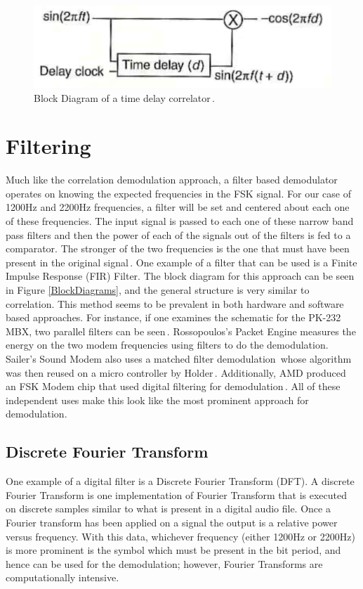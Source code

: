 \begin{figure}
  \centering
	\includegraphics[width=0.75\linewidth]{images/TimeDelayCorrelator.png} 
	\caption{Block Diagram of a time delay correlator\,\cite{Seguine2006}.}
   \label{TimeDelayCorrelator}
\end{figure}

\section{Filtering}
Much like the correlation demodulation approach, a filter based demodulator operates on knowing the expected frequencies in the FSK signal. For our case of 1200Hz and 2200Hz frequencies, a filter will be set and centered about each one of these frequencies. The input signal is passed to each one of these narrow band pass filters and then the power of each of the signals out of the filters is fed to a comparator. The stronger of the two frequencies is the one that must have been present in the original signal\,\cite{Watson1980}. One example of a filter that can be used is a Finite Impulse Response (FIR) Filter. The block diagram for this approach can be seen in Figure \ref{BlockDiagrams}, and the general structure is very similar to correlation. This method seems to be prevalent in both hardware and software based approaches. For instance, if one examines the schematic for the PK-232 MBX, two parallel filters can be seen\,\cite{Inc.2001}. Rossopoulos's Packet Engine measures the energy on the two modem frequencies using filters to do the demodulation. Sailer's Sound Modem also uses a matched filter demodulation\,\cite{Sailer1995} whose algorithm was then reused on a micro controller by Holder\,\cite{Holder2012}. Additionally, AMD produced an FSK Modem chip that used digital filtering for demodulation\,\cite{Devices1989}. All of these independent uses make this look like the most prominent approach for demodulation.

\subsection{Discrete Fourier Transform}
One example of a digital filter is a Discrete Fourier Transform (DFT). A discrete Fourier Transform is one implementation of Fourier Transform that is executed on discrete samples similar to what is present in a digital audio file. Once a Fourier transform has been applied on a signal the output is a relative power versus frequency. With this data, whichever frequency (either 1200Hz or 2200Hz) is more prominent is the symbol which must be present in the bit period, and hence can be used for the demodulation; however, Fourier Transforms are computationally intensive.

